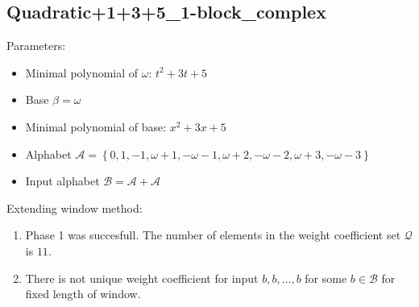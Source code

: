 \subsection{ Quadratic+1+3+5\_1-block\_complex }

\label{subsec:Quadratic+1+3+51-blockcomplex}

Parameters:
\begin{itemize}
    \item Minimal polynomial of $\omega$: $ t^{2} + 3t + 5 $
    \item Base $\beta= \omega $
    \item Minimal polynomial of base: $ x^{2} + 3x + 5 $
    \item Alphabet $\mathcal{A} =\left\{0, 1, -1, \omega + 1, -\omega - 1, \omega + 2, -\omega - 2, \omega + 3, -\omega - 3\right\}$
    \item Input alphabet $\mathcal{B} =\mathcal{A}+ \mathcal{A}$
\end{itemize}

\noindent Extending window method:
\begin{enumerate}
    \item Phase 1 was succesfull.
The number of elements in the weight coefficient set $\mathcal{Q}$ is $11$.

    \item There is not unique weight coefficient for input $b,b,\dots,b$ for some $b\in\mathcal{B}$ for fixed length of window.

\end{enumerate}
